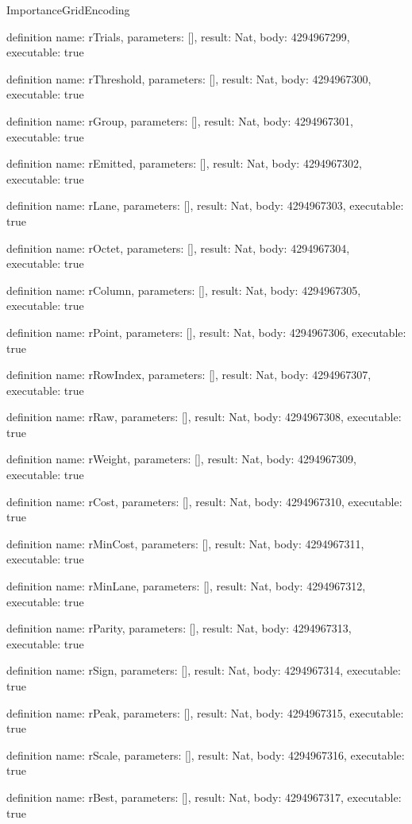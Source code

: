 \begin{lexlean}{ImportanceGridEncoding}
\begin{semanticmodule}
definition{
  name: rTrials,
  parameters: [],
  result: Nat,
  body: 4294967299,
  executable: true
}

definition{
  name: rThreshold,
  parameters: [],
  result: Nat,
  body: 4294967300,
  executable: true
}

definition{
  name: rGroup,
  parameters: [],
  result: Nat,
  body: 4294967301,
  executable: true
}

definition{
  name: rEmitted,
  parameters: [],
  result: Nat,
  body: 4294967302,
  executable: true
}

definition{
  name: rLane,
  parameters: [],
  result: Nat,
  body: 4294967303,
  executable: true
}

definition{
  name: rOctet,
  parameters: [],
  result: Nat,
  body: 4294967304,
  executable: true
}

definition{
  name: rColumn,
  parameters: [],
  result: Nat,
  body: 4294967305,
  executable: true
}

definition{
  name: rPoint,
  parameters: [],
  result: Nat,
  body: 4294967306,
  executable: true
}

definition{
  name: rRowIndex,
  parameters: [],
  result: Nat,
  body: 4294967307,
  executable: true
}

definition{
  name: rRaw,
  parameters: [],
  result: Nat,
  body: 4294967308,
  executable: true
}

definition{
  name: rWeight,
  parameters: [],
  result: Nat,
  body: 4294967309,
  executable: true
}

definition{
  name: rCost,
  parameters: [],
  result: Nat,
  body: 4294967310,
  executable: true
}

definition{
  name: rMinCost,
  parameters: [],
  result: Nat,
  body: 4294967311,
  executable: true
}

definition{
  name: rMinLane,
  parameters: [],
  result: Nat,
  body: 4294967312,
  executable: true
}

definition{
  name: rParity,
  parameters: [],
  result: Nat,
  body: 4294967313,
  executable: true
}

definition{
  name: rSign,
  parameters: [],
  result: Nat,
  body: 4294967314,
  executable: true
}

definition{
  name: rPeak,
  parameters: [],
  result: Nat,
  body: 4294967315,
  executable: true
}

definition{
  name: rScale,
  parameters: [],
  result: Nat,
  body: 4294967316,
  executable: true
}

definition{
  name: rBest,
  parameters: [],
  result: Nat,
  body: 4294967317,
  executable: true
}


\end{semanticmodule}
\end{lexlean}
